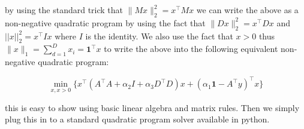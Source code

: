 \documentclass[10pt,a4paper]{article}
\begin{document}
by using the standard trick that $\| Mx\|^2_2 = x^\top M x$ we can write the above as a non-negative quadratic program by using the fact that $\| D x\|^2_2 = x^\top D x$ and $||x||_2^2 = x^\top I x$ where $I$ is the identity. We also use the fact that $x>0$ thus $\| x \|_1 = \sum^D_{d=1} x_i = \boldsymbol{1}^\top x$ to write the above into the following equivalent non-negative quadratic program:

\begin{equation}
\min_{x,x>0} \Big\{ x^{\top}\left( A^\top A + \alpha_2 I + \alpha_3 D^\top D \right)x + (\alpha_1 \boldsymbol{1} - A^\top y)^\top x \Big\}
\end{equation}

this is easy to show using basic linear algebra and matrix rules. Then we simply plug this in to a standard quadratic program solver available in python.
\end{document}
